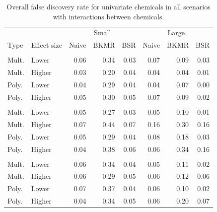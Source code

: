 \documentclass[12pt, twoside]{amherstthesis}
\begin{document}
\begin{table}

\caption{\label{tab:onewaytabfdr}Overall false discovery rate for univariate chemicals in all scenarios with interactions between chemicals.}
\centering
\begin{tabular}[t]{llrrrrrr}
\toprule
\multicolumn{2}{c}{ } & \multicolumn{3}{c}{Small} & \multicolumn{3}{c}{Large} \\
\cmidrule(l{3pt}r{3pt}){3-5} \cmidrule(l{3pt}r{3pt}){6-8}
Type & Effect size & Naive & BKMR & BSR & Naive & BKMR & BSR\\
\midrule
\addlinespace[0.3em]
\multicolumn{8}{l}{\textbf{Hg-Ni}}\\
\hspace{1em}Mult. & Lower & 0.06 & 0.34 & 0.03 & 0.07 & 0.09 & 0.03\\
\hspace{1em}Mult. & Higher & 0.03 & 0.20 & 0.04 & 0.04 & 0.04 & 0.01\\
\hspace{1em}Poly. & Lower & 0.04 & 0.29 & 0.04 & 0.04 & 0.07 & 0.00\\
\hspace{1em}Poly. & Higher & 0.05 & 0.30 & 0.05 & 0.07 & 0.09 & 0.02\\
\addlinespace[0.3em]
\multicolumn{8}{l}{\textbf{Cd-As}}\\
\hspace{1em}Mult. & Lower & 0.05 & 0.27 & 0.03 & 0.05 & 0.10 & 0.01\\
\hspace{1em}Mult. & Higher & 0.07 & 0.44 & 0.07 & 0.16 & 0.30 & 0.16\\
\hspace{1em}Poly. & Lower & 0.05 & 0.29 & 0.04 & 0.08 & 0.18 & 0.03\\
\hspace{1em}Poly. & Higher & 0.04 & 0.38 & 0.06 & 0.06 & 0.34 & 0.16\\
\addlinespace[0.3em]
\multicolumn{8}{l}{\textbf{Ni-Co}}\\
\hspace{1em}Mult. & Lower & 0.06 & 0.34 & 0.04 & 0.05 & 0.11 & 0.02\\
\hspace{1em}Mult. & Higher & 0.06 & 0.29 & 0.05 & 0.06 & 0.12 & 0.06\\
\hspace{1em}Poly. & Lower & 0.07 & 0.37 & 0.04 & 0.06 & 0.10 & 0.02\\
\hspace{1em}Poly. & Higher & 0.04 & 0.34 & 0.05 & 0.06 & 0.20 & 0.07\\

\end{tabular}
\end{table}
\end{document}
